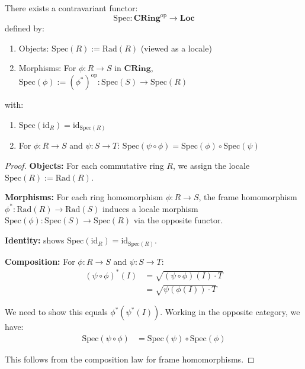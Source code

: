 \begin{theorem}
  \label{thm:functoriality-spec}
  \leanok
  There exists a contravariant functor:
  $$\mathrm{Spec}: \mathbf{CRing}^{\mathrm{op}} \to \mathbf{Loc}$$
  defined by:
  \begin{enumerate}
    \item Objects: $\mathrm{Spec}(R) := \mathrm{Rad}(R)$ (viewed as a locale)
    \item Morphisms: For $\phi: R \to S$ in $\mathbf{CRing}$, $\mathrm{Spec}(\phi) := (\phi^*)^{\mathrm{op}}: \mathrm{Spec}(S) \to \mathrm{Spec}(R)$
  \end{enumerate}
  
  with:
  \begin{enumerate}
    \item $\mathrm{Spec}(\mathrm{id}_R) = \mathrm{id}_{\mathrm{Spec}(R)}$
    \item For $\phi: R \to S$ and $\psi: S \to T$: $\mathrm{Spec}(\psi \circ \phi) = \mathrm{Spec}(\phi) \circ \mathrm{Spec}(\psi)$
  \end{enumerate}
\end{theorem}

\begin{proof}
  \leanok
  \textbf{Objects:} For each commutative ring $R$, we assign the locale $\mathrm{Spec}(R) := \mathrm{Rad}(R)$.
  
  \textbf{Morphisms:} For each ring homomorphism $\phi: R \to S$, the frame homomorphism 
  $\phi^*: \mathrm{Rad}(R) \to \mathrm{Rad}(S)$ induces a locale morphism 
  $\mathrm{Spec}(\phi): \mathrm{Spec}(S) \to \mathrm{Spec}(R)$ via the opposite functor.
  
  \textbf{Identity:}  shows $\mathrm{Spec}(\mathrm{id}_R) = \mathrm{id}_{\mathrm{Spec}(R)}$.
  
  \textbf{Composition:} For $\phi: R \to S$ and $\psi: S \to T$:
  \begin{align*}
    (\psi \circ \phi)^*(I) &= \sqrt{(\psi \circ \phi)(I) \cdot T} \\
    &= \sqrt{\psi(\phi(I)) \cdot T}
  \end{align*}
  
  We need to show this equals $\phi^*(\psi^*(I))$. Working in the opposite category, we have:
  \begin{align*}
    \mathrm{Spec}(\psi \circ \phi) &= \mathrm{Spec}(\psi) \circ \mathrm{Spec}(\phi)
  \end{align*}
  
  This follows from the composition law for frame homomorphisms.
\end{proof}



